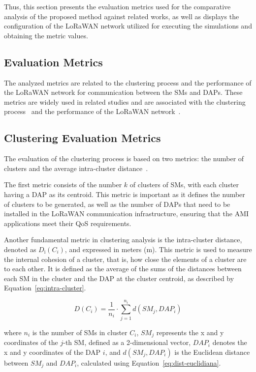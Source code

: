 \documentclass[a4paper,fleqn]{cas-dc}
\begin{document}
Thus, this section presents the evaluation metrics used for the comparative analysis of the proposed method against related works, as well as displays the configuration of the \gls{LoRaWAN} network utilized for executing the simulations and obtaining the metric values.

\subsection{Evaluation Metrics} \label{sec:metrics}

The analyzed metrics are related to the clustering process and the performance of the LoRaWAN network for communication between the \gls{SMs} and \gls{DAPs}. These metrics are widely used in related studies and are associated with the clustering process~\cite{yang2023unsupervised, neriPerformance2022} and the performance of the \gls{LoRaWAN} network~\cite{magrin2020lora, marini2022lpwan}.

\subsection{Clustering Evaluation Metrics}

The evaluation of the clustering process is based on two metrics: the number of clusters and the average intra-cluster distance~\cite{yang2023unsupervised}.

The first metric consists of the number \( k \) of clusters of \gls{SMs}, with each cluster having a DAP as its centroid. This metric is important as it defines the number of clusters to be generated, as well as the number of DAPs that need to be installed in the LoRaWAN communication infrastructure, ensuring that the \gls{AMI} applications meet their \gls{QoS} requirements.

Another fundamental metric in clustering analysis is the intra-cluster distance, denoted as \( D_{\text{i}}(C_i) \), and expressed in meters (m). This metric is used to measure the internal cohesion of a cluster, that is, how close the elements of a cluster are to each other. It is defined as the average of the sums of the distances between each SM in the cluster and the DAP at the cluster centroid, as described by Equation~\ref{eq:intra-cluster}.

\begin{equation} \label{eq:intra-cluster}
    D(C_i) = \frac {1} {n_i} \cdot \sum_{j=1}^{n_i} d(SM_j, DAP_i)
\end{equation}

\noindent where \( n_i \) is the number of \gls{SMs} in cluster \( C_i \), \( {SM}_j \) represents the x and y coordinates of the \( j \)-th SM, defined as a 2-dimensional vector, \( {DAP}_i \) denotes the x and y coordinates of the DAP \( i \), and \( d(SM_j, DAP_i) \) is the Euclidean distance between \( SM_j \) and \( DAP_i \), calculated using Equation~\ref{eq:dist-euclidiana}.
\end{document}
